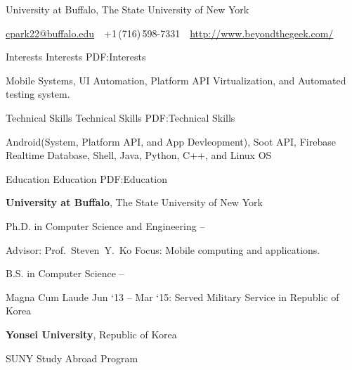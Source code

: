 \documentclass[letterpaper,MMMyyyy,nonstopmode]{simpleresumecv}
\newcommand{\CVAuthor}{Chang Min Park}
\newcommand{\CVWebpage}{http://www.beyondthegeek.com/}
\begin{document}

\Title{\CVAuthor}

\begin{SubTitle}
University at Buffalo, The State University of New York
\par
\href{mailto:cpark22@buffalo.edu}
{cpark22@buffalo.edu}
\,\SubBulletSymbol\,
+1\,(716)\,598-7331
\,\SubBulletSymbol\,
\href{\CVWebpage}
{\url{\CVWebpage}}
\end{SubTitle}

\begin{Body}


\Section
{Interests}
{Interests}
{PDF:Interests}

\Entry
Mobile Systems, UI Automation, Platform API Virtualization, and Automated testing system.


\Section
{Technical Skills}
{Technical Skills}
{PDF:Technical Skills}

\Entry
Android(System, Platform API, and App Devleopment), Soot API, Firebase Realtime Database, Shell, Java, Python, C++, and Linux OS
\BigGap


\Section
{Education}
{Education}
{PDF:Education}

\Entry
\textbf{University at Buffalo}, The State University of New York

\Gap
\BulletItem
Ph.D. in Computer Science and Engineering
\hfill
{} --
\begin{Detail}
\SubBulletItem
Advisor:
Prof.~Steven~Y.~Ko
\SubBulletItem
Focus:
Mobile computing and applications.
\end{Detail}

\Gap
\BulletItem
B.S. in Computer Science
\hfill
{} --
\begin{Detail}
\SubBulletItem
Magna Cum Laude
\SubBulletItem
Jun `13 -- Mar `15: Served Military Service in Republic of Korea
\end{Detail}

\BigGap
\Entry
\textbf{Yonsei University}, Republic of Korea

\Gap
\BulletItem
SUNY Study Abroad Program
\hfill
{}


\end{Body}
\end{document}
